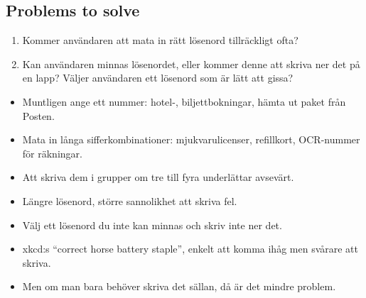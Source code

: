 \documentclass{beamer}
\begin{document}
\subsection{Problems to solve}

\begin{frame}
  \begin{enumerate}
    \item Kommer användaren att mata in rätt lösenord tillräckligt ofta?

    \item Kan användaren minnas lösenordet, eller kommer denne att skriva ner 
      det på en lapp?
      Väljer användaren ett lösenord som är lätt att gissa?

  \end{enumerate}
\end{frame}

\begin{frame}
  \begin{example}
    \begin{itemize}
      \item Muntligen ange ett nummer: hotel-, biljettbokningar, hämta ut paket 
        från Posten.

      \item Mata in långa sifferkombinationer: mjukvarulicenser, refillkort, 
        OCR-nummer för räkningar.

      \item Att skriva dem i grupper om tre till fyra underlättar avsevärt.

      \item Längre lösenord, större sannolikhet att skriva fel.

    \end{itemize}
  \end{example}
\end{frame}

\begin{frame}
  \begin{example}
    \begin{itemize}
      \item Välj ett lösenord du inte kan minnas och skriv inte ner det.

      \item xkcd:s \enquote{correct horse battery staple}, enkelt att komma 
        ihåg men svårare att skriva.

      \item Men om man bara behöver skriva det sällan, då är det mindre problem.

    \end{itemize}
  \end{example}
\end{frame}
\end{document}
